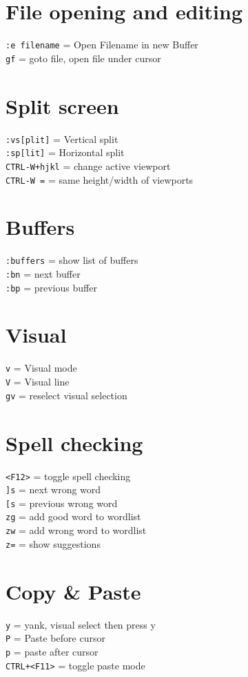 \documentclass[10pt,DIV=50,landscape,pagesize,parskip=off]{scrartcl}
\newcommand\co[1]{\texttt{#1}}
\newcommand\coe[2]{\co{#1} = #2}
\begin{document}
\begin{multicols}{3}
\section{File opening and editing}
\coe{:e filename}{Open Filename in new Buffer}\\
\coe{gf}{goto file, open file under cursor}

\section{Split screen}
\coe{:vs[plit]}{Vertical split}\\
\coe{:sp[lit]}{Horizontal split}\\
\coe{CTRL-W+hjkl}{change active viewport}\\
\coe{CTRL-W =}{same height/width of viewports}

\section{Buffers}
\coe{:buffers}{show list of buffers}\\
\coe{:bn}{next buffer}\\
\coe{:bp}{previous buffer}

\section{Visual}
\coe{v}{Visual mode}\\
\coe{V}{Visual line}\\
\coe{gv}{reselect visual selection}

\section{Spell checking}
\coe{<F12>}{toggle spell checking}\\
\coe{]s}{next wrong word}\\
\coe{[s}{previous wrong word}\\
\coe{zg}{add good word to wordlist}\\
\coe{zw}{add wrong word to wordlist}\\
\coe{z=}{show suggestions}

\section{Copy \& Paste}
\coe{y}{yank, visual select then press y}\\
\coe{P}{Paste before cursor}\\
\coe{p}{paste after cursor}\\
\coe{CTRL+<F11>}{toggle paste mode}


\end{multicols}
\end{document}
